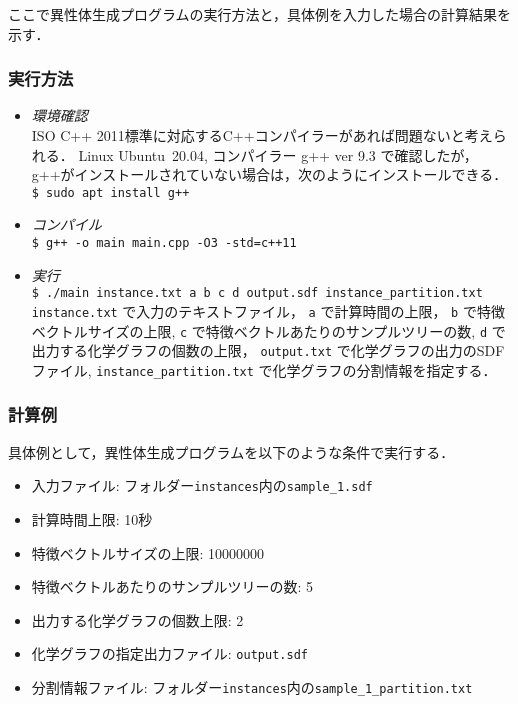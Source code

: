 \documentclass[11pt,titlepage,dvipdfmx,twoside]{jarticle}
\begin{document}
ここで異性体生成プログラムの実行方法と，具体例を入力した場合の計算結果を示す．

\subsubsection{実行方法}
\label{sec:compile_m}
\begin{itemize}
	\item {\em 環境確認}\\
		ISO C++ 2011標準に対応するC++コンパイラーがあれば問題ないと考えられる．
		Linux Ubuntu~20.04, コンパイラー g++ ver 9.3 で確認したが，g++がインストールされていない場合は，次のようにインストールできる．\\
		\verb|$ sudo apt install g++|
	\item {\em コンパイル}\\
		\verb|$ g++ -o main main.cpp -O3 -std=c++11| 
	\item {\em 実行}\\
		\verb|$ ./main instance.txt a b c d output.sdf instance_partition.txt|\\
		\verb|instance.txt| で入力のテキストファイル，
		\verb|a| で計算時間の上限，
		\verb|b| で特徴ベクトルサイズの上限,
		\verb|c| で特徴ベクトルあたりのサンプルツリーの数,
		\verb|d| で出力する化学グラフの個数の上限，
		\verb|output.txt| で化学グラフの出力のSDFファイル,
		\verb|instance_partition.txt| で化学グラフの分割情報を指定する．
\end{itemize}


\subsubsection{計算例}
\label{sec:instance_p}

具体例として，異性体生成プログラムを以下のような条件で実行する．

\begin{itemize}
\item 入力ファイル: フォルダー{\tt instances}内の{\tt sample\_1.sdf}
\item 計算時間上限: 10秒
\item 特徴ベクトルサイズの上限: 10000000
\item 特徴ベクトルあたりのサンプルツリーの数: 5
\item 出力する化学グラフの個数上限: 2
\item 化学グラフの指定出力ファイル: {\tt output.sdf}
\item 分割情報ファイル: フォルダー{\tt instances}内の{\tt sample\_1\_partition.txt}
\end{itemize}
\end{document}
